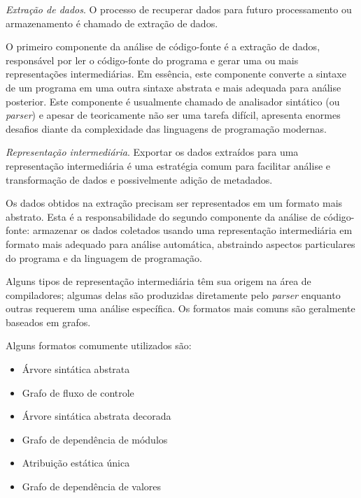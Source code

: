 \begin{description}

  \item \textit{Extração de dados}.
    O processo de recuperar dados para futuro processamento ou armazenamento é
    chamado de extração de dados. 

    O primeiro componente da análise de código-fonte é a extração de dados,
    responsável por ler o código-fonte do programa e gerar uma ou mais
    representações intermediárias. Em essência, este componente converte a sintaxe
    de um programa em uma outra sintaxe abstrata e mais adequada para análise
    posterior. Este componente é usualmente chamado de analisador sintático
    (ou {\it parser}) e apesar de teoricamente não ser uma tarefa difícil,
    apresenta enormes desafios diante da complexidade das linguagens de
    programação modernas.

  \item \textit{Representação intermediária}.
    Exportar os dados extraídos para uma representação intermediária é uma
    estratégia comum para facilitar análise e transformação de dados e
    possivelmente adição de metadados.

    Os dados obtidos na extração precisam ser representados em um formato mais
    abstrato. Esta é a responsabilidade do segundo componente da análise de
    código-fonte: armazenar os dados coletados usando uma representação
    intermediária em formato mais adequado para análise automática, abstraindo
    aspectos particulares do programa e da linguagem de programação.

    Alguns tipos de representação intermediária têm sua origem na área de
    compiladores; algumas delas são produzidas diretamente pelo {\it parser}
    enquanto outras requerem uma análise específica. Os formatos mais comuns
    são geralmente baseados em grafos. 

    Alguns formatos comumente utilizados são:
    \begin{multicols}{2}
      \begin{itemize}
        \item Árvore sintática abstrata
        \item Grafo de fluxo de controle
        \item Árvore sintática abstrata decorada
        \item Grafo de dependência de módulos
        \item Atribuição estática única
        \item Grafo de dependência de valores
      \end{itemize}
    \end{multicols}


\end{description}
